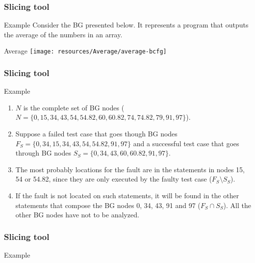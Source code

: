 \begin{frame}
\frametitle{Slicing tool}

\begin{block}{Example}
Consider the BG presented below. It represents a program that outputs the
average of the numbers in an array.
\end{block}

\begin{block}{Average}
\centering
\texttt{[image: resources/Average/average-bcfg]}
\end{block}
\end{frame}


\begin{frame}
\frametitle{Slicing tool}

\begin{block}{Example}
\begin{enumerate}
	\item $N$ is the complete set of BG nodes ($N = \{0, 15, 34, 43, 54,
	54.82, 60, 60.82, 74, 74.82, 79, 91, 97\}$).

	\item Suppose a failed test case that goes though BG nodes
	$F_S = \{0, 34, 15, 34, 43, 54, 54.82, 91, 97\}$ and a successful
	test case that goes through BG nodes $S_S = \{0, 34, 43, 60,
	60.82, 91, 97\}$.

	\item The most probably locations for the fault are in
	the statements in nodes 15, 54 or 54.82, since they are only
	executed by the faulty test case ($F_S \setminus S_S$).

	\item If the fault is not located on such statements, it will be found in
	the other statements that compose the BG nodes 0, 34, 43, 91 and 97
	($F_S \cap S_S$). All the other BG nodes have not to be analyzed.
\end{enumerate}
\end{block}
\end{frame}



\begin{frame}[hasnext=false]
\frametitle{Slicing tool}

\begin{block}{Example}
\end{block}
\end{frame}
